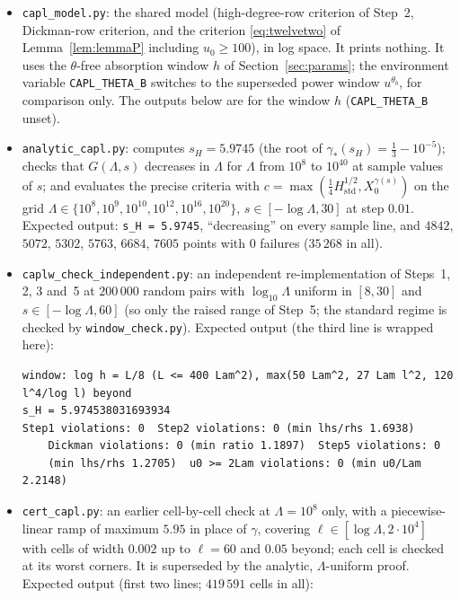 \begin{itemize}
\item \texttt{capl\_model.py}: the shared model (high-degree-row criterion of Step~2, Dickman-row criterion, and the criterion
\eqref{eq:twelvetwo} of Lemma~\ref{lem:lemmaP} including $u_0\ge100$), in log space. It prints nothing. It uses the
$\theta$-free absorption window $h$ of Section~\ref{sec:params}; the environment variable \texttt{CAPL\_THETA\_B} switches to the
superseded power window $u^{\theta_b}$, for comparison only. The outputs below are for the window $h$ (\texttt{CAPL\_THETA\_B} unset).
\item \texttt{analytic\_capl.py}: computes $s_H=5.9745$ (the root of $\gamma_*(s_H)=\tfrac13-10^{-5}$); checks that $G(\Lambda,s)$
decreases in $\Lambda$ for $\Lambda$ from $10^8$ to $10^{40}$ at sample values of $s$; and evaluates the precise criteria with
$c=\max(\tfrac14H_{\mathrm{std}}^{1/2},X_0^{\gamma(s)})$ on the grid $\Lambda\in\{10^8,10^9,10^{10},10^{12},10^{16},10^{20}\}$,
$s\in[-\log\Lambda,30]$ at step $0.01$. Expected output: \texttt{s\_H = 5.9745}, ``decreasing'' on every sample line, and
$4842$, $5072$, $5302$, $5763$, $6684$, $7605$ points with $0$ failures ($35\,268$ in all).
\item \texttt{caplw\_check\_independent.py}: an independent re-implementation of Steps~1, 2, 3 and~5 at $200\,000$ random pairs with
$\log_{10}\Lambda$ uniform in $[8,30]$ and $s\in[-\log\Lambda,60]$ (so only the raised range of Step~5; the standard regime is checked
by \texttt{window\_check.py}). Expected output (the third line is wrapped here):
\begingroup\footnotesize
\begin{verbatim}
window: log h = L/8 (L <= 400 Lam^2), max(50 Lam^2, 27 Lam l^2, 120 l^4/log l) beyond
s_H = 5.974538031693934
Step1 violations: 0  Step2 violations: 0 (min lhs/rhs 1.6938)
    Dickman violations: 0 (min ratio 1.1897)  Step5 violations: 0
    (min lhs/rhs 1.2705)  u0 >= 2Lam violations: 0 (min u0/Lam 2.2148)
\end{verbatim}
\endgroup
\item \texttt{cert\_capl.py}: an earlier cell-by-cell check at $\Lambda=10^8$ only, with a piecewise-linear ramp of maximum $5.95$ in
place of $\gamma$, covering $\ell\in[\log\Lambda,2\cdot10^4]$ with cells of width $0.002$ up to $\ell=60$ and $0.05$ beyond; each cell is
checked at its worst corners. It is superseded by the analytic, $\Lambda$-uniform proof. Expected output (first two lines;
$419\,591$ cells in all):
\begingroup\footnotesize
\begin{verbatim}

\end{verbatim}
\end{itemize}
